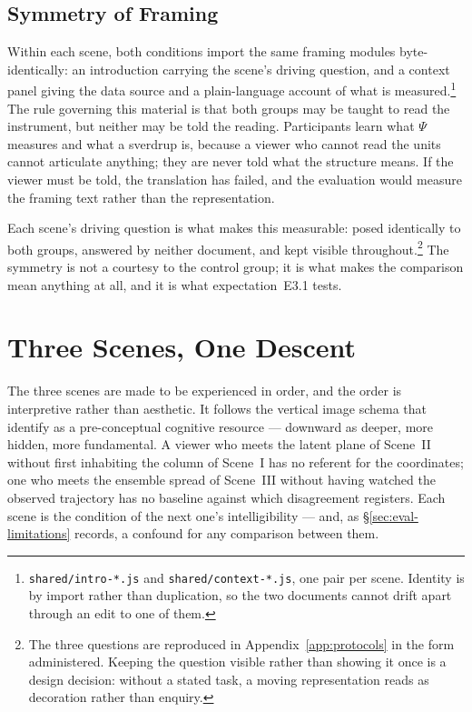 \subsection{Symmetry of Framing}
\label{subsec:symmetry}

Within each scene, both conditions import the same framing modules byte-identically: an introduction carrying the scene's driving question, and a context panel giving the data source and a plain-language account of what is measured.\footnote{\texttt{shared/intro-*.js} and \texttt{shared/context-*.js}, one pair per scene. Identity is by import rather than duplication, so the two documents cannot drift apart through an edit to one of them.} The rule governing this material is that both groups may be taught to read the instrument, but neither may be told the reading. Participants learn what $\Psi$ measures and what a sverdrup is, because a viewer who cannot read the units cannot articulate anything; they are never told what the structure means. If the viewer must be told, the translation has failed, and the evaluation would measure the framing text rather than the representation.

Each scene's driving question is what makes this measurable: posed identically to both groups, answered by neither document, and kept visible throughout.\footnote{The three questions are reproduced in Appendix~\ref{app:protocols} in the form administered. Keeping the question visible rather than showing it once is a design decision: without a stated task, a moving representation reads as decoration rather than enquiry.} The symmetry is not a courtesy to the control group; it is what makes the comparison mean anything at all, and it is what expectation~E3.1 tests.

\section{Three Scenes, One Descent}
\label{sec:three-scenes}

The three scenes are made to be experienced in order, and the order is interpretive rather than aesthetic. It follows the vertical image schema that \citet{lakoff1999} identify as a pre-conceptual cognitive resource --- downward as deeper, more hidden, more fundamental. A viewer who meets the latent plane of Scene~II without first inhabiting the column of Scene~I has no referent for the coordinates; one who meets the ensemble spread of Scene~III without having watched the observed trajectory has no baseline against which disagreement registers. Each scene is the condition of the next one's intelligibility --- and, as \S\ref{sec:eval-limitations} records, a confound for any comparison between them.


